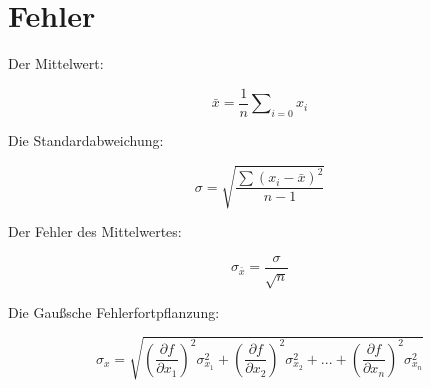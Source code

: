 \section{Fehler}
\label{sec:Fehler}
Der Mittelwert:
\begin{center}
  \begin{equation}
    \label{eq:Mittelwert}
  \bar{x} = \frac{1}{n} \sum \nolimits_{i=0} x_i
  \end{equation} 
\end{center}

Die Standardabweichung:
\begin{center}
  \begin{equation}
    \label{eq:standardabweichung}
    \sigma=\sqrt{\frac{\sum(x_i-\bar{x})^2}{n-1}}
  \end{equation}
\end{center}

Der Fehler des Mittelwertes:
\begin{center}
  \begin{equation}
    \label{eq:mittelwertfehler}
    \sigma_{\bar{x}}=\frac{\sigma}{\sqrt{n}}
  \end{equation}

  
\end{center}


Die Gaußsche Fehlerfortpflanzung:
\begin{center}
\begin{equation}
  \label{eq:gaussfehler}  
\sigma_x=\sqrt{(\frac{\partial f}{\partial x_1})^2\sigma_{x_1}^2+(\frac{\partial f}{\partial x_2})^2\sigma_{x_2}^2+...+(\frac{\partial f}{\partial x_n})^2\sigma_{x_n}^2}
\end{equation}
\end{center}